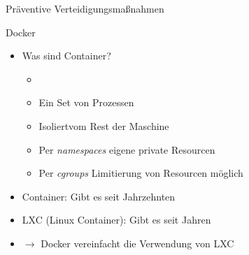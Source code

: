 \begin{frame}{Präventive Verteidigungsmaßnahmen}
        \begin{block}{Docker}
                \begin{itemize}[<+->]
                        \item Was sind Container?
                        \begin{itemize}[<+->]
                                \item \textbf{}\footnotemark
                                \item Ein Set von Prozessen
                                \item Isoliert\footnotemark vom Rest der Maschine
                                \item Per \textit{namespaces} eigene private Resourcen
                                \item Per \textit{cgroups} Limitierung von Resourcen möglich
                        \end{itemize}
                        \item Container: Gibt es seit Jahrzehnten
                        \item LXC (Linux Container): Gibt es seit Jahren
                        \item $\rightarrow$ Docker vereinfacht die Verwendung von LXC 
                \end{itemize}
        \end{block}


\end{frame}

